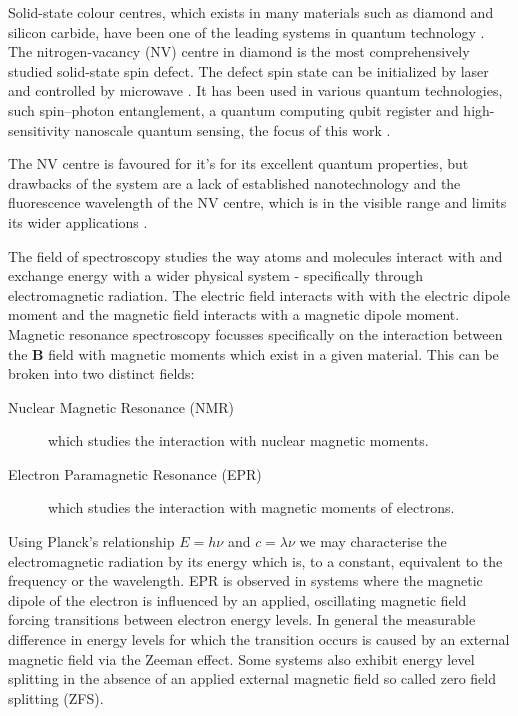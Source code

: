 Solid-state colour centres, which exists in many materials such as diamond and silicon carbide, have been one of the leading systems in quantum technology
\cite{Son2020, Awschalom2018}. 
The nitrogen-vacancy (NV) centre in diamond is the most comprehensively studied solid-state spin defect. The defect spin state can be initialized by laser and controlled by microwave \cite{Zhang2020, Atatre2018, Schirhagl2014}. It has been used in various quantum technologies, such spin–photon entanglement, a quantum computing qubit register and high-sensitivity nanoscale quantum sensing, the focus of this work \cite{Hensen2015, PhysRevX.9.031045}. 


The NV centre is favoured for it's for its excellent quantum properties, but
drawbacks of the system are a lack of established nanotechnology and the fluorescence wavelength of the NV centre, which is in the visible range and limits its wider applications \cite{Koehl2011, Christle2014, Widmann2014} . 

The field of spectroscopy studies the way atoms and molecules interact with and exchange energy with a wider physical system - specifically through electromagnetic radiation. The electric field interacts with with the electric dipole moment and the magnetic field interacts with a magnetic dipole moment.
Magnetic resonance spectroscopy focusses specifically on the interaction between the $\mathbf{B}$ field with magnetic moments which exist in a given material. This can be broken into two distinct fields:

\begin{description}
	\item [Nuclear Magnetic Resonance (NMR)] which studies the interaction with nuclear magnetic moments.
	\item [Electron Paramagnetic Resonance (EPR)] which studies the interaction with magnetic moments of electrons.
\end{description}

Using Planck's relationship $E = h \nu$  and $c = \lambda \nu$ we may characterise the electromagnetic radiation by its energy which is, to a constant, equivalent to the frequency or the wavelength. EPR is observed in systems where the magnetic dipole of the electron is influenced by an applied, oscillating magnetic field forcing transitions between electron energy levels. In general the measurable difference in energy levels for which the transition occurs is caused by an external magnetic field via the Zeeman effect. Some systems also exhibit energy level splitting in the absence of an applied external magnetic field so called zero field splitting (ZFS).


